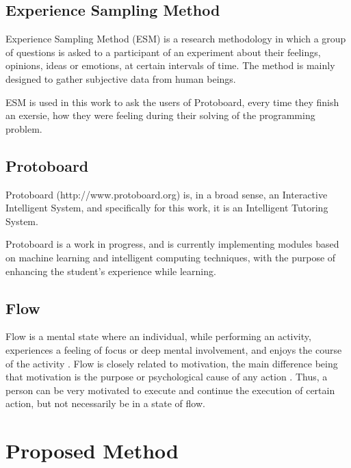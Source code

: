 \documentclass{acm_proc_article-sp}
\begin{document}

\subsection{Experience Sampling Method}
\label{ESM}

Experience Sampling Method (ESM) is a research methodology in which a
group of questions is asked to a participant of an experiment about
their feelings, opinions, ideas or emotions, at certain intervals of
time. The method is mainly designed to gather subjective data from
human beings.

ESM is used in this work to ask the users of Protoboard, every time
they finish an exersie, how they were feeling during their solving of
the programming problem.


\subsection{Protoboard}

Protoboard (http://www.protoboard.org) is, in a broad sense, an
Interactive Intelligent System, and specifically for this work, it is
an Intelligent Tutoring System.

Protoboard is a work in progress, and is currently implementing
modules based on machine learning and intelligent computing
techniques, with the purpose of enhancing the student's experience
while learning.



\subsection{Flow}

Flow is a mental state where an individual, while performing an
activity, experiences a feeling of focus or deep mental
involvement, and enjoys the course of the activity \cite{cit:4}. Flow
is closely related to motivation, the main difference being that
motivation is the purpose or psychological cause of any action
\cite{cit:16}. Thus, a person can be very motivated to execute and
continue the execution of certain action, but not necessarily be in a
state of flow.


\section{Proposed Method}
\label{proposed-method}
\end{document}
